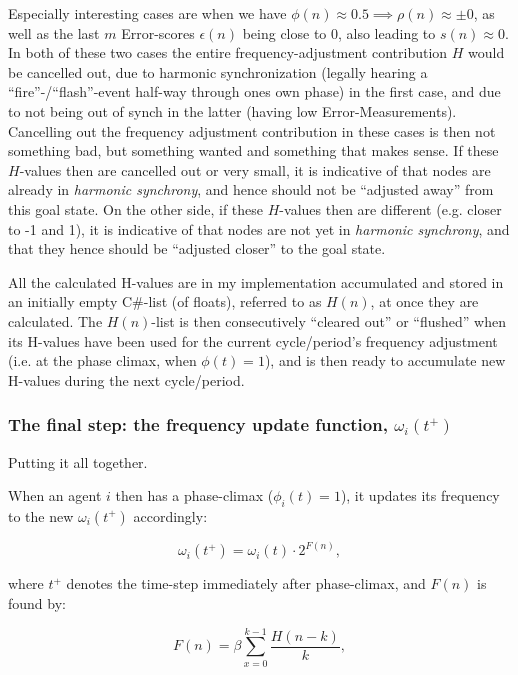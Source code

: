 	Especially interesting cases are when we have $\phi(n)\approx0.5 \implies \rho(n)\approx\pm0$, as well as the last $m$ Error-scores $\epsilon(n)$ being close to 0, also leading to $s(n)\approx0$. In both of these two cases the entire frequency-adjustment contribution $H$ would be cancelled out, due to harmonic synchronization (legally hearing a ``fire''-/``flash''-event half-way through ones own phase) in the first case, and due to not being out of synch in the latter (having low Error-Measurements). Cancelling out the frequency adjustment contribution in these cases is then not something bad, but something wanted and something that makes sense. If these $H$-values then are cancelled out or very small, it is indicative of that nodes are already in \textit{harmonic synchrony}, and hence should not be ``adjusted away'' from this goal state. On the other side, if these $H$-values then are different (e.g. closer to -1 and 1), it is indicative of that nodes are not yet in \textit{harmonic synchrony}, and that they hence should be ``adjusted closer'' to the goal state.
	
	All the calculated H-values are in my implementation accumulated and stored in an initially empty C\#-list (of floats), referred to as $H(n)$, at once they are calculated. The $H(n)$-list is then consecutively ``cleared out'' or ``flushed'' when its H-values have been used for the current cycle/period's frequency adjustment (i.e. at the phase climax, when $\phi(t)=1$), and is then ready to accumulate new H-values during the next cycle/period.
	
	\subsubsection{The final step: the frequency update function, $\omega_i(t^+)$}
	
	Putting it all together.
	
	When an agent $i$ then has a phase-climax ($\phi_i(t)=1$), it updates its frequency to the new $\omega_i(t^+)$ accordingly:
	
	\begin{equation}
	\label{freq_adj}
		\omega_i(t^+) = \omega_i(t) \cdot 2^{F(n)},
	\end{equation}
	
	where $t^+$ denotes the time-step immediately after phase-climax, and $F(n)$ is found by:
	
	\begin{equation}
	\label{f_value}
		F(n) = \beta\sum_{x=0}^{k-1}\frac{H(n-k)}{k},
	\end{equation}
	
